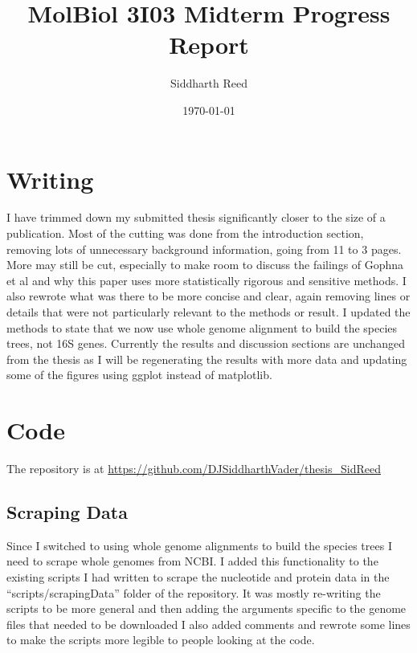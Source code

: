 \documentclass[12pt,letter]{article}
\begin{document}
\title{\vspace{-1in}MolBiol 3I03 Midterm Progress Report}
\author{Siddharth Reed}
\date{\vspace{-0.2in}\today}
\maketitle
\vspace{-0.5in}
\section{Writing}
I have trimmed down my submitted thesis significantly closer to the size of a publication.
Most of the cutting was done from the introduction section, removing lots of unnecessary background information, going from 11 to 3 pages.
More may still be cut, especially to make room to discuss the failings of Gophna et al and why this paper uses more statistically rigorous and sensitive methods.
I also rewrote what was there to be more concise and clear, again removing lines or details that were not particularly relevant to the methods or result.
I updated the methods to state that we now use whole genome alignment to build the species trees, not 16S genes.
Currently the results and discussion sections are unchanged from the thesis as I will be regenerating the results with more data and updating some of the figures using ggplot instead of matplotlib.

\section{Code}
The repository is at \url{https://github.com/DJSiddharthVader/thesis_SidReed}
\subsection{Scraping Data}
Since I switched to using whole genome alignments to build the species trees I need to scrape whole genomes from NCBI.
I added this functionality to the existing scripts I had written to scrape the nucleotide and protein data in the ``scripts/scrapingData'' folder of the repository.
It was mostly re-writing the scripts to be more general and then adding the arguments specific to the genome files that needed to be downloaded
I also added comments and rewrote some lines to make the scripts more legible to people looking at the code.
\end{document}

